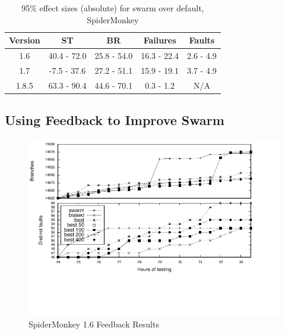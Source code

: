 \begin{table}
\caption{95\% effect sizes (absolute) for swarm over default, SpiderMonkey}

\begin{tabular}{c||c|c|c|c}
\hline
Version & ST & BR & Failures & Faults \\
\hline
\hline
1.6 & 40.4 - 72.0 & 25.8 - 54.0 & 16.3 - 22.4 & 2.6 - 4.9\\
\hline
1.7 & -7.5 - 37.6 & 27.2 - 51.1 & 15.9 - 19.1 & 3.7 - 4.9\\
\hline
1.8.5 & 63.3 - 90.4 & 44.6 - 70.1 & 0.3 - 1.2 & N/A\\
\hline
\end{tabular}
\label{tab:effect}
\end{table}

\subsection{Using Feedback to Improve Swarm}

\begin{figure}[t]
  \centering
  \includegraphics[width=\textwidth]{../graphs/SpiderMonkey/js16strats}
  \vspace{-1.3in}
  \caption{SpiderMonkey 1.6 Feedback Results}
  \label{fig:smonkey16strat}
\end{figure}

